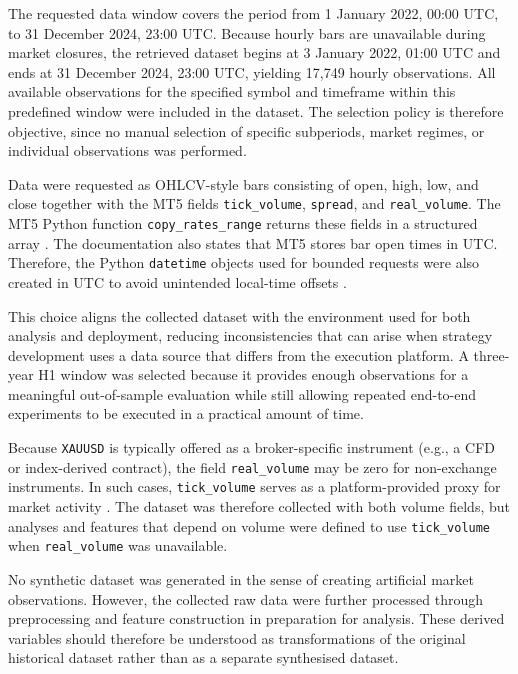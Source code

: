 The requested data window covers the period from 1 January 2022, 00:00 UTC, to
31 December 2024, 23:00 UTC. Because hourly bars are unavailable during market
closures, the retrieved dataset begins at 3 January 2022, 01:00 UTC and ends at
31 December 2024, 23:00 UTC, yielding 17,749 hourly observations. All available
observations for the specified symbol and timeframe within this predefined
window were included in the dataset. The selection policy is therefore
objective, since no manual selection of specific subperiods, market regimes, or
individual observations was performed.

Data were requested as OHLCV-style bars consisting of open, high, low, and
close together with the MT5 fields \texttt{tick\_volume},
\texttt{spread}, and \texttt{real\_volume}. The MT5 Python function
\texttt{copy\_rates\_range} returns these fields in a structured array
\citep{mt5_copy_rates_range, mql5_mqlrates_struct}. The documentation also
states that MT5 stores bar open times in UTC. Therefore, the Python
\texttt{datetime} objects used for bounded requests were also created in UTC to
avoid unintended local-time offsets \citep{mt5_copy_rates_range}.

This choice aligns the collected dataset with the environment used for both
analysis and deployment, reducing inconsistencies that can arise when strategy
development uses a data source that differs from the execution platform. A
three-year H1 window was selected because it provides enough observations for a
meaningful out-of-sample evaluation while still allowing repeated end-to-end
experiments to be executed in a practical amount of time.

Because \texttt{XAUUSD} is typically offered as a broker-specific instrument
(e.g., a CFD or index-derived contract), the field \texttt{real\_volume} may be
zero for non-exchange instruments. In such cases, \texttt{tick\_volume} serves
as a platform-provided proxy for market activity
\citep{mql5_timeseries_ohlcvs, mql5_mqlrates_struct}. The dataset was
therefore collected with both volume fields, but analyses and features that
depend on volume were defined to use \texttt{tick\_volume} when
\texttt{real\_volume} was unavailable.

No synthetic dataset was generated in the sense of creating artificial market
observations. However, the collected raw data were further processed through
preprocessing and feature construction in preparation for analysis. These
derived variables should therefore be understood as transformations of the
original historical dataset rather than as a separate synthesised dataset.


